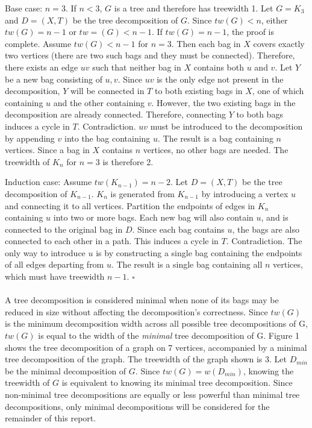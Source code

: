 \documentclass[12pt,conference]{IEEEtran}
\theoremstyle{plain}
\begin{document}
Base case: $n=3$. If $n<3$, $G$ is a tree and therefore has treewidth 1. Let $G=K_{3}$ and $D=(X,T)$ be the tree decomposition of $G$. Since $tw(G)<n$, either $tw(G)=n-1$ or $tw=(G)<n-1$. If $tw(G)=n-1$, the proof is complete. Assume $tw(G)<n-1$ for $n=3$. Then each bag in $X$ covers exactly two vertices (there are two such bags and they must be connected). Therefore, there exists an edge $uv$ such that neither bag in $X$ contains both $u$ and $v$. Let $Y$ be a new bag consisting of $u,v$. Since $uv$ is the only edge not present in the decomposition, $Y$ will be connected in $T$ to both existing bags in $X$, one of which containing $u$ and the other containing $v$. However, the two existing bags in the decomposition are already connected. Therefore, connecting $Y$ to both bags induces a cycle in $T$. Contradiction. $uv$ must be introduced to the decomposition by appending $v$ into the bag containing $u$. The result is a bag containing $n$ vertices. Since a bag in $X$ contains $n$ vertices, no other bags are needed. The treewidth of $K_{n}$ for $n=3$ is therefore 2.

Induction case: Assume $tw(K_{n-1})=n-2$. Let $D=(X,T)$ be the tree decomposition of $K_{n-1}$. $K_{n}$ is generated from $K_{n-1}$ by introducing a vertex $u$ and connecting it to all vertices. Partition the endpoints of edges in $K_{n}$ containing $u$ into two or more bags. Each new bag will also contain $u$, and is connected to the original bag in $D$. Since each bag contains $u$, the bags are also connected to each other in a path. This induces a cycle in $T$. Contradiction. The only way to introduce $u$ is by constructing a single bag containing the endpoints of all edges departing from $u$. The result is a single bag containing all $n$ vertices, which must have treewidth $n-1$. $\square$
\\
\\
A tree decomposition is considered minimal when none of its bags may be reduced in size without affecting the decomposition's correctness. Since $tw(G)$ is the minimum decomposition width across all possible tree decompositions of G, $tw(G)$ is equal to the width of the \textit{minimal} tree decomposition of G. Figure 1 shows the tree decomposition of a graph on 7 vertices, accompanied by a minimal tree decomposition of the graph. The treewidth of the graph shown is 3. Let $D_{min}$ be the minimal decomposition of $G$. Since $tw(G) = w(D_{min})$, knowing the treewidth of $G$ is equivalent to knowing its minimal tree decomposition. Since non-minimal tree decompositions are equally or less powerful than minimal tree decompositions, only minimal decompositions will be considered for the remainder of this report.
\end{document}
